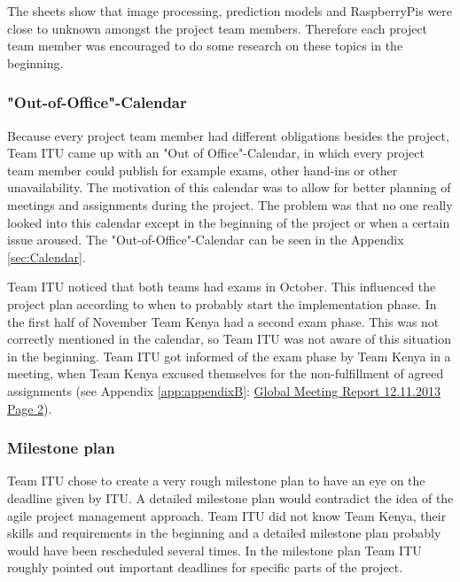 The sheets show that image processing, prediction models and RaspberryPis were close to unknown amongst the project team members. Therefore each project team member was encouraged to do some research on these topics in the beginning.


\subsubsection{"Out-of-Office"-Calendar}
Because every project team member had different obligations besides the project, Team ITU came up with an "Out of Office"-Calendar, in which every project team member could publish for example exams, other hand-ins or other unavailability. The motivation of this calendar was to allow for better planning of meetings and assignments during the project. The problem was that no one really looked into this calendar except in the beginning of the project or when a certain issue aroused. The "Out-of-Office"-Calendar can be seen in the Appendix \ref{sec:Calendar}.

Team ITU noticed that both teams had exams in October. This influenced the project plan according to when to probably start the implementation phase. In the first half of November Team Kenya had a second exam phase. This was not correctly mentioned in the calendar, so Team ITU was not aware of this situation in the beginning. Team ITU got informed of the exam phase by Team Kenya in a meeting, when Team Kenya excused themselves for the non-fulfillment of agreed assignments (see Appendix \ref{app:appendixB}: \hyperlink{GSD20131112.2}{Global Meeting Report 12.11.2013 Page 2}).


\subsubsection{Milestone plan}
\label{sec:milestone_plan}
Team ITU chose to create a very rough milestone plan to have an eye on the deadline given by ITU. A detailed milestone plan would contradict the idea of the agile project management approach. Team ITU did not know Team Kenya, their skills and requirements in the beginning and a detailed milestone plan probably would have been rescheduled several times. In the milestone plan Team ITU roughly pointed out important deadlines for specific parts of the project.

